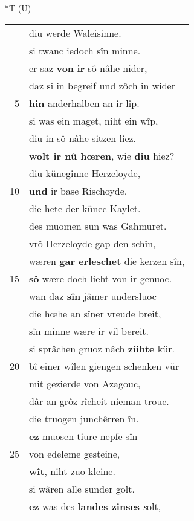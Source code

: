 \documentclass[8pt,a4paper,notitlepage]{article}
\begin{document}
\begin{table}[ht]
\begin{minipage}[t]{0.5\linewidth}
\end{minipage}
\hspace{0.5cm}
\begin{minipage}[t]{0.5\linewidth}
\small
\begin{center}*T (U)
\end{center}
\begin{tabular}{rl}
 & diu werde Waleisinne.\\ 
 & si twanc iedoch sîn minne.\\ 
 & er saz \textbf{von} \textbf{ir} sô nâhe nider,\\ 
 & daz si in begreif und zôch in wider\\ 
5 & \textbf{hin} anderhalben an ir lîp.\\ 
 & si was ein maget, niht ein wîp,\\ 
 & diu in sô nâhe sitzen liez.\\ 
 & \textbf{wolt ir nû hœren}, wie \textbf{diu} hiez?\\ 
 & diu küneginne Herzeloyde,\\ 
10 & \textbf{und} ir base Rischoyde,\\ 
 & die hete der künec Kaylet.\\ 
 & des muomen sun was Gahmuret.\\ 
 & vrô Herzeloyde gap den schîn,\\ 
 & wæren \textbf{gar erleschet} die kerzen sîn,\\ 
15 & \textbf{sô} wære doch lieht von ir genuoc.\\ 
 & wan daz \textbf{sîn} jâmer undersluoc\\ 
 & die hœhe an sîner vreude breit,\\ 
 & sîn minne wære ir vil bereit.\\ 
 & si sprâchen gruoz nâch \textbf{zühte} kür.\\ 
20 & bî einer wîlen giengen schenken vür\\ 
 & mit gezierde von Azagouc,\\ 
 & dâr an grôz rîcheit nieman trouc.\\ 
 & die truogen junchêrren în.\\ 
 & \textbf{ez} muosen tiure nepfe sîn\\ 
25 & von edeleme gesteine,\\ 
 & \textbf{wît}, niht zuo kleine.\\ 
 & si wâren alle sunder golt.\\ 
 & \textbf{ez} was des \textbf{landes zinses} \textit{s}olt,\\ 

\end{tabular}
\end{minipage}
\end{table}
\end{document}
